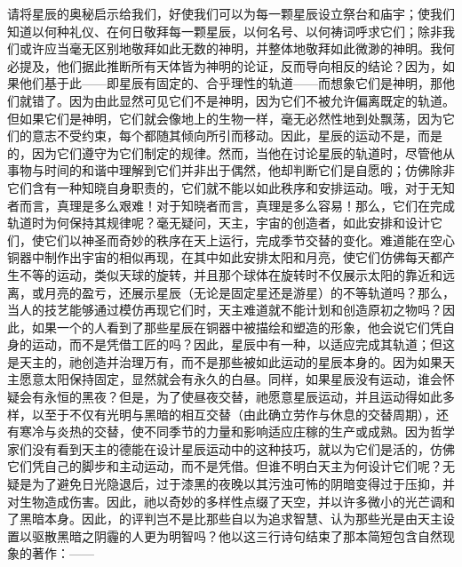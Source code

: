 请将星辰的奥秘启示给我们，好使我们可以为每一颗星辰设立祭台和庙宇；使我们知道以何种礼仪、在何日敬拜每一颗星辰，以何名号、以何祷词呼求它们；除非我们或许应当毫无区别地敬拜如此无数的神明，并整体地敬拜如此微渺的神明。我何必提及，他们据此推断所有天体皆为神明的论证，反而导向相反的结论？因为，如果他们基于此——即星辰有固定的、合乎理性的轨道——而想象它们是神明，那他们就错了。因为由此显然可见它们不是神明，因为它们不被允许偏离既定的轨道。但如果它们是神明，它们就会像地上的生物一样，毫无必然性地到处飘荡，因为它们的意志不受约束，每个都随其倾向所引而移动。因此，星辰的运动不是，而是的，因为它们遵守为它们制定的规律。然而，当他在讨论星辰的轨道时，尽管他从事物与时间的和谐中理解到它们并非出于偶然，他却判断它们是自愿的；仿佛除非它们含有一种知晓自身职责的，它们就不能以如此秩序和安排运动。哦，对于无知者而言，真理是多么艰难！对于知晓者而言，真理是多么容易！那么，它们在完成轨道时为何保持其规律呢？毫无疑问，天主，宇宙的创造者，如此安排和设计它们，使它们以神圣而奇妙的秩序在天上运行，完成季节交替的变化。难道能在空心铜器中制作出宇宙的相似再现，在其中如此安排太阳和月亮，使它们仿佛每天都产生不等的运动，类似天球的旋转，并且那个球体在旋转时不仅展示太阳的靠近和远离，或月亮的盈亏，还展示星辰（无论是固定星还是游星）的不等轨道吗？那么，当人的技艺能够通过模仿再现它们时，天主难道就不能计划和创造原初之物吗？因此，如果一个的人看到了那些星辰在铜器中被描绘和塑造的形象，他会说它们凭自身的运动，而不是凭借工匠的吗？因此，星辰中有一种，以适应完成其轨道；但这是天主的，祂创造并治理万有，而不是那些被如此运动的星辰本身的。因为如果天主愿意太阳保持固定，显然就会有永久的白昼。同样，如果星辰没有运动，谁会怀疑会有永恒的黑夜？但是，为了使昼夜交替，祂愿意星辰运动，并且运动得如此多样，以至于不仅有光明与黑暗的相互交替（由此确立劳作与休息的交替周期），还有寒冷与炎热的交替，使不同季节的力量和影响适应庄稼的生产或成熟。因为哲学家们没有看到天主的德能在设计星辰运动中的这种技巧，就以为它们是活的，仿佛它们凭自己的脚步和主动运动，而不是凭借。但谁不明白天主为何设计它们呢？无疑是为了避免日光隐退后，过于漆黑的夜晚以其污浊可怖的阴暗变得过于压抑，并对生物造成伤害。因此，祂以奇妙的多样性点缀了天空，并以许多微小的光芒调和了黑暗本身。因此，的评判岂不是比那些自以为追求智慧、认为那些光是由天主设置以驱散黑暗之阴霾的人更为明智吗？他以这三行诗句结束了那本简短包含自然现象的著作：——\par

